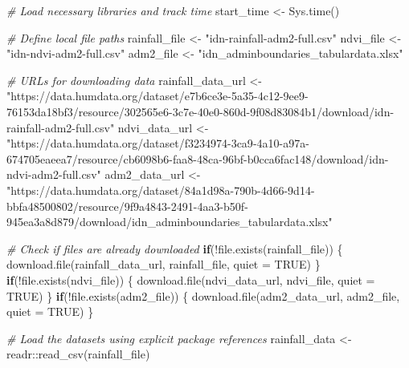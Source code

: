 \documentclass[
]{article}
\newenvironment{Shaded}{}{}
\newcommand{\AttributeTok}[1]{\textcolor[rgb]{0.49,0.56,0.16}{#1}}
\newcommand{\CommentTok}[1]{\textcolor[rgb]{0.38,0.63,0.69}{\textit{#1}}}
\newcommand{\ConstantTok}[1]{\textcolor[rgb]{0.53,0.00,0.00}{#1}}
\newcommand{\ControlFlowTok}[1]{\textcolor[rgb]{0.00,0.44,0.13}{\textbf{#1}}}
\newcommand{\FunctionTok}[1]{\textcolor[rgb]{0.02,0.16,0.49}{#1}}
\newcommand{\NormalTok}[1]{#1}
\newcommand{\OtherTok}[1]{\textcolor[rgb]{0.00,0.44,0.13}{#1}}
\newcommand{\SpecialCharTok}[1]{\textcolor[rgb]{0.25,0.44,0.63}{#1}}
\newcommand{\StringTok}[1]{\textcolor[rgb]{0.25,0.44,0.63}{#1}}
\begin{document}
\begin{Shaded}
\begin{Highlighting}[]
\CommentTok{\# Load necessary libraries and track time}
\NormalTok{start\_time }\OtherTok{\textless{}{-}} \FunctionTok{Sys.time}\NormalTok{()}

\CommentTok{\# Define local file paths}
\NormalTok{rainfall\_file }\OtherTok{\textless{}{-}} \StringTok{"idn{-}rainfall{-}adm2{-}full.csv"}
\NormalTok{ndvi\_file }\OtherTok{\textless{}{-}} \StringTok{"idn{-}ndvi{-}adm2{-}full.csv"}
\NormalTok{adm2\_file }\OtherTok{\textless{}{-}} \StringTok{"idn\_adminboundaries\_tabulardata.xlsx"}

\CommentTok{\# URLs for downloading data}
\NormalTok{rainfall\_data\_url }\OtherTok{\textless{}{-}} \StringTok{"https://data.humdata.org/dataset/e7b6ce3e{-}5a35{-}4c12{-}9ee9{-}76153da18bf3/resource/302565e6{-}3c7e{-}40e0{-}860d{-}9f08d83084b1/download/idn{-}rainfall{-}adm2{-}full.csv"}
\NormalTok{ndvi\_data\_url }\OtherTok{\textless{}{-}} \StringTok{"https://data.humdata.org/dataset/f3234974{-}3ca9{-}4a10{-}a97a{-}674705eaeea7/resource/cb6098b6{-}faa8{-}48ca{-}96bf{-}b0cca6fac148/download/idn{-}ndvi{-}adm2{-}full.csv"}
\NormalTok{adm2\_data\_url }\OtherTok{\textless{}{-}} \StringTok{"https://data.humdata.org/dataset/84a1d98a{-}790b{-}4d66{-}9d14{-}bbfa48500802/resource/9f9a4843{-}2491{-}4aa3{-}b50f{-}945ea3a8d879/download/idn\_adminboundaries\_tabulardata.xlsx"}

\CommentTok{\# Check if files are already downloaded}
\ControlFlowTok{if}\NormalTok{(}\SpecialCharTok{!}\FunctionTok{file.exists}\NormalTok{(rainfall\_file)) \{}
  \FunctionTok{download.file}\NormalTok{(rainfall\_data\_url, rainfall\_file, }\AttributeTok{quiet =} \ConstantTok{TRUE}\NormalTok{)}
\NormalTok{\}}
\ControlFlowTok{if}\NormalTok{(}\SpecialCharTok{!}\FunctionTok{file.exists}\NormalTok{(ndvi\_file)) \{}
  \FunctionTok{download.file}\NormalTok{(ndvi\_data\_url, ndvi\_file, }\AttributeTok{quiet =} \ConstantTok{TRUE}\NormalTok{)}
\NormalTok{\}}
\ControlFlowTok{if}\NormalTok{(}\SpecialCharTok{!}\FunctionTok{file.exists}\NormalTok{(adm2\_file)) \{}
  \FunctionTok{download.file}\NormalTok{(adm2\_data\_url, adm2\_file, }\AttributeTok{quiet =} \ConstantTok{TRUE}\NormalTok{)}
\NormalTok{\}}

\CommentTok{\# Load the datasets using explicit package references}
\NormalTok{rainfall\_data }\OtherTok{\textless{}{-}}\NormalTok{ readr}\SpecialCharTok{::}\FunctionTok{read\_csv}\NormalTok{(rainfall\_file)}
\end{Highlighting}
\end{Shaded}
\end{document}

